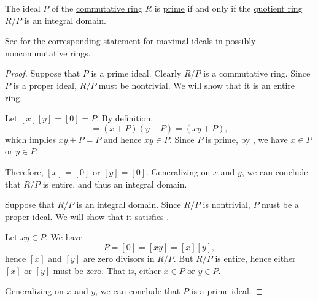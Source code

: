 \begin{proposition}\label{thm:quotient_by_prime_ideal}
  The ideal \( P \) of the \hyperref[def:ring/commutative]{commutative ring} \( R \) is \hyperref[def:semiring_ideal/prime]{prime} if and only if the \hyperref[def:ring/quotient]{quotient ring} \( R / P \) is an \hyperref[def:integral_domain]{integral domain}.

  See  for the corresponding statement for \hyperref[def:semiring_ideal/maximal]{maximal ideals} in possibly noncommutative rings.
\end{proposition}
\begin{proof}
  \SufficiencySubProof Suppose that \( P \) is a prime ideal. Clearly \( R / P \) is a commutative ring. Since \( P \) is a proper ideal, \( R / P \) must be nontrivial. We will show that it is an \hyperref[def:entire_semiring]{entire ring}.

  Let \( [x] [y] = [0] = P \). By definition,
  \begin{equation*}
    [x] [y] = (x + P) (y + P) = (xy + P),
  \end{equation*}
  which implies \( xy + P = P \) and hence \( xy \in P \). Since \( P \) is prime, by , we have \( x \in P \) or \( y \in P \).

  Therefore, \( [x] = [0] \) or \( [y] = [0] \). Generalizing on \( x \) and \( y \), we can conclude that \( R / P \) is entire, and thus an integral domain.

  \NecessitySubProof Suppose that \( R / P \) is an integral domain. Since \( R / P \) is nontrivial, \( P \) must be a proper ideal. We will show that it satisfies .

  Let \( xy \in P \). We have
  \begin{equation*}
    P = [0] = [xy] = [x] [y],
  \end{equation*}
  hence \( [x] \) and \( [y] \) are zero divisors in \( R / P \). But \( R / P \) is entire, hence either \( [x] \) or \( [y] \) must be zero. That is, either \( x \in P \) or \( y \in P \).

  Generalizing on \( x \) and \( y \), we can conclude that \( P \) is a prime ideal.
\end{proof}

